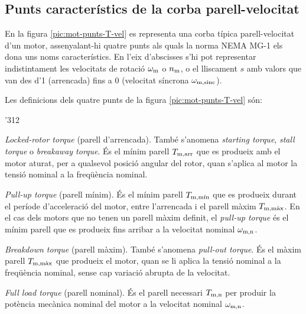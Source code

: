 \subsection{Punts característics de la corba parell-velocitat}

En la figura \vref{pic:mot-punts-T-vel} es representa una corba típica parell-velocitat d'un motor, assenyalant-hi quatre punts als quals la norma NEMA MG-1 els dona uns noms característics. En l'eix d'abscisses s'hi pot representar indistintament les velocitats de rotació $\omega_\mathrm{m}$ o $n_\mathrm{m}$, o  el lliscament $s$ amb valors que van des d'1 (arrencada) fins a 0 (velocitat síncrona $\omega_\mathrm{m,sinc}$).

\begin{center}
	
	\label{pic:mot-punts-T-vel}
\end{center}

Les definicions dels quatre punts de la figura  \vref{pic:mot-punts-T-vel} són:
\begin{dingautolist}{'312}
   \item \textit{Locked-rotor torque} (parell d'arrencada). També s'anomena \textit{starting torque}, \textit{stall torque} o \textit{breakaway torque}. És el mínim parell $T_\mathrm{m,arr}$ que es produeix amb el motor aturat, per a qualsevol posició angular del rotor, quan s'aplica al motor la tensió nominal a la freqüència nominal.
   \item \textit{Pull-up torque} (parell mínim). És el mínim parell $T_\mathrm{m,\text{mín}}$ que es produeix durant el període d'acceleració del motor, entre l'arrencada  i el parell màxim $T_\mathrm{m,\text{màx}}$. En el cas dels motors que no tenen un parell màxim definit, el \textit{pull-up torque} és el mínim parell que es produeix fins arribar a la velocitat nominal $\omega_\mathrm{m,n}$.
   \item \textit{Breakdown torque} (parell màxim). També s'anomena \textit{pull-out torque}. És el màxim parell $T_\mathrm{m,\text{màx}}$ que  produeix  el motor, quan se li aplica  la tensió nominal a la freqüència nominal, sense cap variació abrupta de la velocitat.
   \item \textit{Full load torque} (parell nominal). És el parell necessari $T_\mathrm{m,n}$ per produir la potència mecànica nominal del motor a la velocitat nominal  $\omega_\mathrm{m,n}$.
\end{dingautolist}


